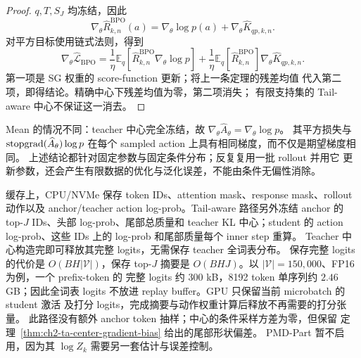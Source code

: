 \begin{proof}
$q,T,S_J$ 均冻结，因此
\begin{equation}
 \nabla_\theta\widehat R_{k,n}^{\mathrm{BPO}}(a)
 =\nabla_\theta\log p(a)+\nabla_\theta\widehat K_{qp,k,n}.
\end{equation}
对平方目标使用链式法则，得到
\begin{equation}
 \nabla_\theta\widehat{\mathcal L}_{\mathrm{BPO}}
 =\frac1\eta\mathbb E_q[\widehat R_{k,n}^{\mathrm{BPO}}\nabla_\theta\log p]
 +\frac1\eta\mathbb E_q[\widehat R_{k,n}^{\mathrm{BPO}}]
   \nabla_\theta\widehat K_{qp,k,n}.
\end{equation}
第一项是 SG 权重的 score-function 更新；将上一条定理的残差均值 代入第二项，即得结论。精确中心下残差均值为零，第二项消失； 有限支持集的 Tail-aware 中心不保证这一消去。
\end{proof}

Mean 的情况不同：teacher 中心完全冻结，故 $\nabla_\theta\widehat A_\theta=\nabla_\theta\log p$。 其平方损失与 $\operatorname{stopgrad}(\widehat A_\theta)\log p$ 在每个 sampled action 上具有相同梯度，而不仅是期望梯度相同。 上述结论都针对固定参数与固定条件分布；反复复用一批 rollout 并用它 更新参数，还会产生有限数据的优化与泛化误差，不能由条件无偏性消除。

缓存上，CPU/NVMe 保存 token IDs、attention mask、response mask、rollout 动作以及 anchor/teacher action log-prob。Tail-aware 路径另外冻结 anchor 的 top-$J$ IDs、头部 log-prob、尾部总质量和 teacher KL 中心；student 的 action log-prob、这些 IDs 上的 log-prob 和尾部质量每个 inner step 重算。 Teacher 中心构造完即可释放其完整 logits，无需保存 teacher 全词表分布。 保存完整 logits 的代价是 $O(BH|\mathcal V|)$，保存 top-$J$ 摘要是 $O(BHJ)$。以 $|\mathcal V|=150{,}000$、FP16 为例，一个 prefix-token 的 完整 logits 约 $300$ kB，8192 token 单序列约 $2.46$ GB；因此全词表 logits 不放进 replay buffer。GPU 只保留当前 microbatch 的 student 激活 及打分 logits，完成摘要与动作权重计算后释放不再需要的打分张量。 此路径没有额外 anchor token 抽样；中心的条件采样方差为零，但保留 定理~\ref{thm:ch2-ta-center-gradient-bias} 给出的尾部形状偏差。 PMD-Part 暂不启用，因为其 $\log Z_k$ 需要另一套估计与误差控制。


